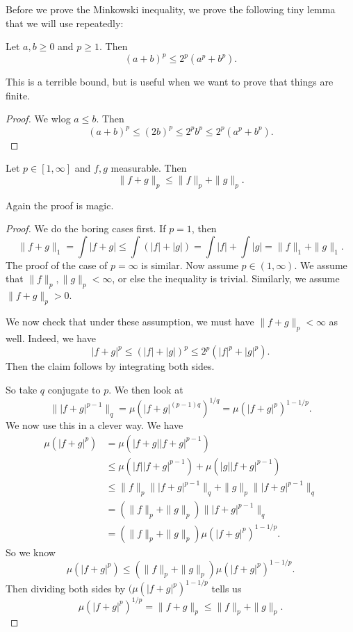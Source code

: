 \documentclass[a4paper]{article}
\begin{document}
Before we prove the Minkowski inequality, we prove the following tiny lemma that we will use repeatedly:
\begin{lemma}
  Let $a, b \geq 0$ and $p \geq 1$. Then
  \[
    (a + b)^p \leq 2^p(a^p + b^p).
  \]
\end{lemma}
This is a terrible bound, but is useful when we want to prove that things are finite.

\begin{proof}
  We wlog $a \leq b$. Then
  \[
    (a + b)^p \leq (2b)^p \leq 2^p b^p \leq 2^p(a^p + b^p).
  \]
\end{proof}
\begin{thm}
  Let $p \in [1, \infty]$ and $f, g$ measurable. Then
  \[
    \|f + g\|_p \leq \|f\|_p + \|g\|_p.
  \]
\end{thm}

Again the proof is magic.
\begin{proof}
  We do the boring cases first. If $p = 1$, then
  \[
    \|f + g\|_1 = \int |f + g| \leq \int (|f| + |g|) = \int |f| + \int |g| = \|f\|_1 + \|g\|_1.
  \]
  The proof of the case of $p = \infty$ is similar. Now assume $p \in (1, \infty)$. We assume that $\|f\|_p, \|g\|_p< \infty$, or else the inequality is trivial. Similarly, we assume $\|f + g\|_p > 0$.

  We now check that under these assumption, we must have $\|f + g\|_p < \infty$ as well. Indeed, we have
  \[
    |f + g|^p \leq (|f| + |g|)^p \leq 2^p(|f|^p + |g|^p).
  \]
  Then the claim follows by integrating both sides.

  So take $q$ conjugate to $p$. We then look at
  \[
    \||f + g|^{p - 1}\|_q = \mu(|f + g|^{(p - 1)q})^{1/q} = \mu(|f + g|^p)^{1 - 1/p}.
  \]
  We now use this in a clever way. We have
  \begin{align*}
    \mu(|f + g|^p) &= \mu(|f + g| |f + g|^{p - 1}) \\
    &\leq \mu(|f||f + g|^{p - 1}) + \mu(|g||f + g|^{p - 1})\\
    &\leq \|f\|_p \||f + g|^{p - 1}\|_q + \|g\|_p \||f + g|^{p - 1}\|_q\\
    &= (\|f\|_p + \|g\|_p) \||f + g|^{p - 1}\|_q\\
    &= (\|f\|_p + \|g\|_p) \mu(|f + g|^p)^{1 - 1/p}.
  \end{align*}
  So we know
  \[
    \mu(|f + g|^p) \leq (\|f\|_p + \|g\|_p) \mu(|f + g|^p)^{1 - 1/p}.
  \]
  Then dividing both sides by $(\mu(|f + g|^p)^{1 - 1/p}$ tells us
  \[
    \mu(|f + g|^p)^{1/p} = \|f + g\|_p \leq \|f\|_p + \|g\|_p.
  \]
\end{proof}
\end{document}
